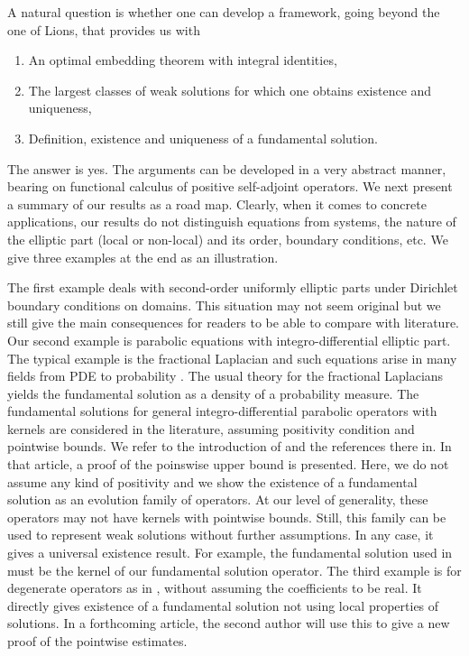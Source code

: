 \documentclass[11pt, letterpaper]{amsart}
\theoremstyle{definition}
\theoremstyle{remark}
\numberwithin{equation}{section}
\begin{document}
A natural question is whether one can develop a framework, going beyond the one of Lions, that provides us with  \begin{enumerate}
\item An  optimal embedding theorem with integral identities,
\item The largest classes of weak solutions for which one obtains existence and uniqueness,
\item Definition, existence and uniqueness of a fundamental solution.
\end{enumerate}
The answer is yes. The arguments can be developed in a very abstract manner, bearing on functional calculus of positive self-adjoint operators. We next present a summary of our results as a road map. Clearly, when it comes to concrete applications,  our results do not distinguish equations from systems, the nature of the elliptic part (local or non-local) and its order, boundary conditions, etc.  
We give three examples at the end as an illustration. 

The first example deals with second-order uniformly elliptic parts under Dirichlet boundary conditions on domains. This situation may not seem original but we still give the main consequences for readers to be able to compare with literature. Our second example is parabolic equations with integro-differential elliptic part. The typical example is the fractional Laplacian and such equations arise in many fields from PDE to probability \cite{lions1969quelques, caffarelli2007extension, bogdan2012estimates}. The usual theory for  the  fractional Laplacians  yields the fundamental solution  as a density of a probability measure. The fundamental solutions for general integro-differential  parabolic operators with kernels are considered  in the literature, assuming positivity condition and pointwise bounds. We refer to the introduction of \cite{kassmann2023upper} and the references there in. In that article, a proof of the poinswise upper bound is presented. Here, we do not assume any kind of positivity and we show the existence of a fundamental solution as an evolution family of operators. At our level of generality, these operators may not have kernels with pointwise bounds. Still, this family can be used to represent weak solutions without further assumptions. In any case,  it gives a universal existence result. For example, the fundamental solution  used in \cite{kassmann2023upper} must be the kernel of our fundamental solution operator. The third example is for degenerate operators as in \cite{ataei2024fundamental}, without assuming the coefficients to be real. It directly gives  existence of a fundamental solution not using local properties of solutions. In a forthcoming article, the second author will use this to give a new proof of the pointwise estimates.
\end{document}
